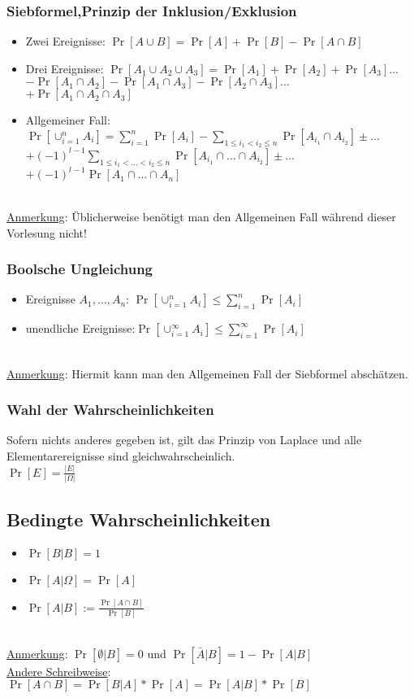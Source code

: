 \subsubsection{Siebformel,Prinzip der Inklusion/Exklusion}
\begin{itemize}
\item Zwei Ereignisse: $\Pr[A\cup B]=\Pr[A]+\Pr[B]-\Pr[A\cap B]$
\item Drei Ereignisse: $\Pr[A_1\cup A_2\cup A_3]=\Pr[A_1]+\Pr[A_2]+\Pr[A_3]\ldots$\\
				$-\Pr[A_1\cap A_2]-\Pr[A_1\cap A_3]-\Pr[A_2\cap A_3]\ldots$\\
				$+\Pr[A_1\cap A_2\cap A_3]$
\item Allgemeiner Fall: $\Pr[\cup^n_{i=1}A_i]=\sum_{i=1}^n\Pr[A_i]-\sum_{1\leq i_1<i_2\leq n}\Pr[A_{i_1}\cap A_{i_2}]\pm \ldots$\\
				$+(-1)^{l-1}\sum_{1\leq i_1<\ldots<i_2\leq n}\Pr[A_{i_1}\cap\ldots\cap A_{i_2}]\pm\ldots$\\
				$+(-1)^{l-1}\Pr[A_1\cap\ldots\cap A_n]$
\end{itemize}
\\
\underline{Anmerkung}: Üblicherweise benötigt man den Allgemeinen Fall während dieser Vorlesung nicht!\\

\subsubsection{Boolsche Ungleichung}

\begin{itemize}
\item Ereignisse $A_1,\ldots, A_n$: $\Pr[\cup_{i=1}^n A_i]\leq\sum_{i=1}^n\Pr[A_i]$
\item unendliche Ereignisse:$\Pr[\cup^\infty_{i=1} A_i]\leq\sum^\infty_{i=1}\Pr[A_i]$
\end{itemize}
\\
\underline{Anmerkung}: Hiermit kann man den Allgemeinen Fall der Siebformel abschätzen.

\subsubsection{Wahl der Wahrscheinlichkeiten}
Sofern nichts anderes gegeben ist, gilt das Prinzip von Laplace und alle Elementarereignisse sind gleichwahrscheinlich.\\
$\Pr[E]=\frac{|E|}{|\Omega |}$

\subsection{Bedingte Wahrscheinlichkeiten}
\begin{itemize}
\item $\Pr[B|B]=1$
\item $\Pr[A|\Omega]=\Pr[A]$
\item $\Pr[A|B]:=\frac{\Pr[A\cap B]}{\Pr[B]}$
\end{itemize}
\\
\underline{Anmerkung}: $\Pr[\emptyset | B]= 0$ und $\Pr[\bar A|B]=1-\Pr[A|B]$\\
\underline{Andere Schreibweise}: $\Pr[A\cap B]=\Pr[B|A]*\Pr[A]= \Pr[A|B]*\Pr[B]$


